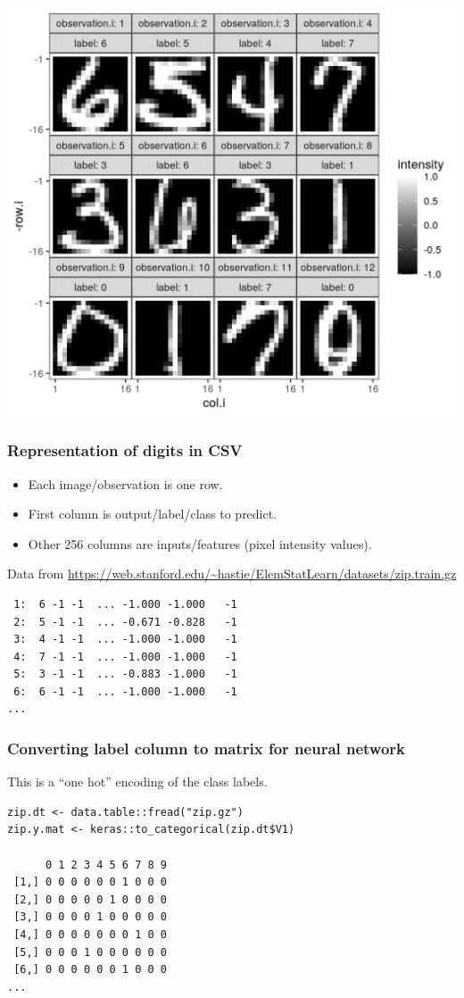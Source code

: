 \documentclass{beamer}
\begin{document}
\begin{frame}
  \includegraphics[height=\textheight]{figure-validation-loss-digits}
\end{frame}

\begin{frame}[fragile]
  \frametitle{Representation of digits in CSV}

  \begin{itemize}
  \item Each image/observation is one row.
  \item First column is output/label/class to predict.
  \item Other 256 columns are inputs/features (pixel intensity
    values).
  \end{itemize}
 Data from {\scriptsize \url{https://web.stanford.edu/~hastie/ElemStatLearn/datasets/zip.train.gz}}

\begin{verbatim}
 1:  6 -1 -1  ... -1.000 -1.000   -1
 2:  5 -1 -1  ... -0.671 -0.828   -1
 3:  4 -1 -1  ... -1.000 -1.000   -1
 4:  7 -1 -1  ... -1.000 -1.000   -1
 5:  3 -1 -1  ... -0.883 -1.000   -1
 6:  6 -1 -1  ... -1.000 -1.000   -1
...
\end{verbatim}
  
\end{frame}

\begin{frame}[fragile]
  \frametitle{Converting label column to matrix for neural network}

  This is a ``one hot'' encoding of the class labels.  
  
\begin{verbatim}
zip.dt <- data.table::fread("zip.gz")
zip.y.mat <- keras::to_categorical(zip.dt$V1)

      0 1 2 3 4 5 6 7 8 9
 [1,] 0 0 0 0 0 0 1 0 0 0
 [2,] 0 0 0 0 0 1 0 0 0 0
 [3,] 0 0 0 0 1 0 0 0 0 0
 [4,] 0 0 0 0 0 0 0 1 0 0
 [5,] 0 0 0 1 0 0 0 0 0 0
 [6,] 0 0 0 0 0 0 1 0 0 0
...
\end{verbatim}


\end{frame}
\end{document}
